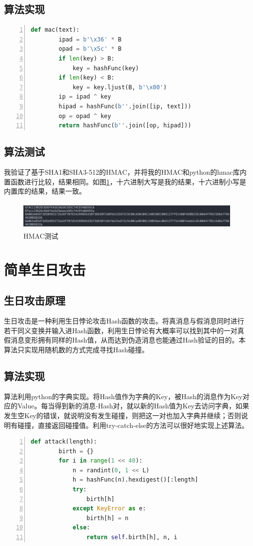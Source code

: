 \documentclass[11pt]{ctexart}
\begin{document}
\subsection{算法实现} %
\begin{lstlisting}[language={python},
    numbers=left,
    numberstyle=\tiny\monaco,
    basicstyle=\small\monaco]
    def mac(text):
        ipad = b'\x36' * B
        opad = b'\x5c' * B
        if len(key) > B:
            key = hashFunc(key)
        if len(key) < B:
            key = key.ljust(B, b'\x00')
        ip = ipad ^ key
        hipad = hashFunc(b''.join([ip, text]))
        op = opad ^ key
        return hashFunc(b''.join([op, hipad]))
    \end{lstlisting}
\subsection{算法测试} %
我验证了基于SHA1和SHA3-512的HMAC，并将我的HMAC和python的hmac库内置函数进行比较，结果相同。如图\ref{img_hmac}，十六进制大写是我的结果，十六进制小写是内置库的结果，结果一致。
\begin{figure}[htbp]
\centering
\includegraphics[width=13.66cm, height=1.42cm]{hmac.png}
\caption{HMAC测试}
\label{img_hmac}
\end{figure}
\section{简单生日攻击} %
\subsection{生日攻击原理} %
生日攻击是一种利用生日悖论攻击Hash函数的攻击。将真消息与假消息同时进行若干同义变换并输入进Hash函数，利用生日悖论有大概率可以找到其中的一对真假消息变形拥有同样的Hash值，从而达到伪造消息也能通过Hash验证的目的。本算法只实现用随机数的方式完成寻找Hash碰撞。
\subsection{算法实现} %
算法利用python的字典实现。将Hash值作为字典的Key，被Hash的消息作为Key对应的Value。每当得到新的消息-Hash对，就以新的Hash值为Key去访问字典，如果发生空Key的错误，就说明没有发生碰撞，则把这一对也加入字典并继续；否则说明有碰撞，直接返回碰撞值。利用try-catch-else的方法可以很好地实现上述算法。
\begin{lstlisting}[language={python},
    numbers=left,
    numberstyle=\tiny\monaco,
    basicstyle=\small\monaco]
    def attack(length):
        birth = {}
        for i in range(1 << 40):
            n = randint(0, 1 << L)
            h = hashFunc(n).hexdigest()[:length]
            try:
                birth[h]
            except KeyError as e:
                birth[h] = n
            else:
                return self.birth[h], n, i
\end{lstlisting}
\end{document}
